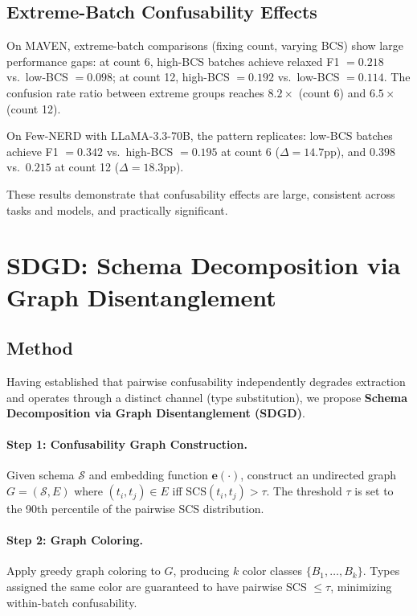 \documentclass[11pt,a4paper]{article}
\begin{document}
\subsection{Extreme-Batch Confusability Effects}
\label{sec:extreme}

On MAVEN, extreme-batch comparisons (fixing count, varying BCS) show large performance gaps:
at count 6, high-BCS batches achieve relaxed F1 $= 0.218$ vs.\ low-BCS $= 0.098$;
at count 12, high-BCS $= 0.192$ vs.\ low-BCS $= 0.114$.
The confusion rate ratio between extreme groups reaches $8.2\times$ (count 6) and $6.5\times$ (count 12).

On Few-NERD with LLaMA-3.3-70B, the pattern replicates: low-BCS batches achieve F1 $= 0.342$ vs.\ high-BCS $= 0.195$ at count 6 ($\Delta{=}14.7$pp), and $0.398$ vs.\ $0.215$ at count 12 ($\Delta{=}18.3$pp).

These results demonstrate that confusability effects are large, consistent across tasks and models, and practically significant.

\section{SDGD: Schema Decomposition via Graph Disentanglement}
\label{sec:sdgd}

\subsection{Method}

Having established that pairwise confusability independently degrades extraction and operates through a distinct channel (type substitution), we propose \textbf{Schema Decomposition via Graph Disentanglement (SDGD)}.

\paragraph{Step 1: Confusability Graph Construction.}
Given schema $\mathcal{S}$ and embedding function $\mathbf{e}(\cdot)$, construct an undirected graph $G = (\mathcal{S}, E)$ where $(t_i, t_j) \in E$ iff $\text{SCS}(t_i, t_j) > \tau$.
The threshold $\tau$ is set to the 90th percentile of the pairwise SCS distribution.

\paragraph{Step 2: Graph Coloring.}
Apply greedy graph coloring to $G$, producing $k$ color classes $\{B_1, \ldots, B_k\}$.
Types assigned the same color are guaranteed to have pairwise SCS $\leq \tau$, minimizing within-batch confusability.
\end{document}
